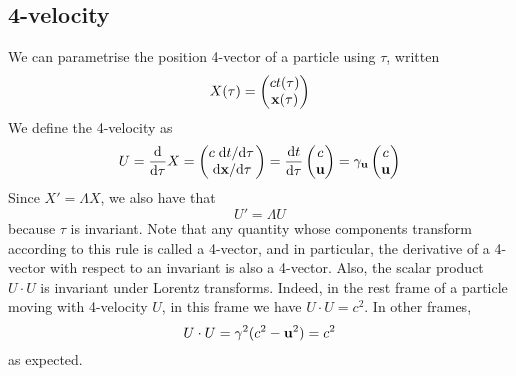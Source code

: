 \subsection{4-velocity}
We can parametrise the position 4-vector of a particle using \(\tau\), written
\[
	X(\tau) = \begin{pmatrix}
		ct(\tau) \\ \vb x(\tau)
	\end{pmatrix}
\]
We define the 4-velocity as
\[
	U = \dv{\tau}X = \begin{pmatrix}
		c\dv*{t}{\tau} \\ \dv*{\vb x}{\tau}
	\end{pmatrix} = \dv{t}{\tau} \begin{pmatrix}
		c \\ \vb u
	\end{pmatrix} = \gamma_{\vb u} \begin{pmatrix}
		c \\ \vb u
	\end{pmatrix}
\]
Since \(X' = \Lambda X\), we also have that
\[
	U' = \Lambda U
\]
because \(\tau\) is invariant.
Note that any quantity whose components transform according to this rule is called a 4-vector, and in particular, the derivative of a 4-vector with respect to an invariant is also a 4-vector.
Also, the scalar product \(U \cdot U\) is invariant under Lorentz transforms.
Indeed, in the rest frame of a particle moving with 4-velocity \(U\), in this frame we have \(U\cdot U = c^2\).
In other frames,
\[
	U \cdot U = \gamma^2 (c^2 - \vb u^2) = c^2
\]
as expected.

